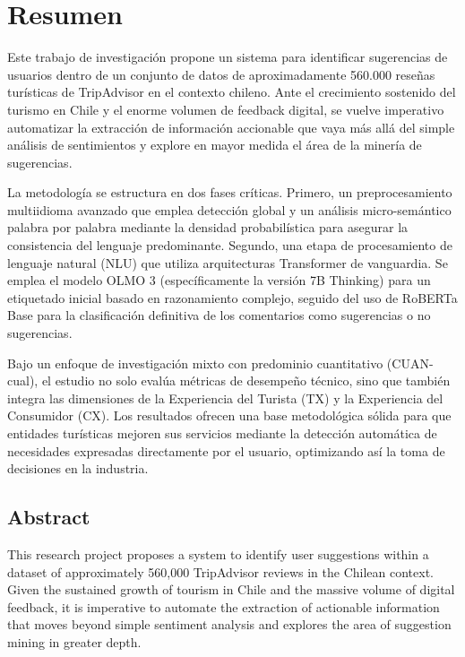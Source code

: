 \chapter{Resumen}
\label{cha:resumen}

Este trabajo de investigación propone un sistema para identificar sugerencias de usuarios dentro de un conjunto de datos de aproximadamente 560.000 reseñas turísticas de TripAdvisor en el contexto chileno. Ante el crecimiento sostenido del turismo en Chile y el enorme volumen de feedback digital, se vuelve imperativo automatizar la extracción de información accionable que vaya más allá del simple análisis de sentimientos y explore en mayor medida el área de la minería de sugerencias.

La metodología se estructura en dos fases críticas. Primero, un preprocesamiento multiidioma avanzado que emplea detección global y un análisis micro-semántico palabra por palabra mediante la densidad probabilística para asegurar la consistencia del lenguaje predominante. Segundo, una etapa de procesamiento de lenguaje natural (NLU) que utiliza arquitecturas Transformer de vanguardia. Se emplea el modelo OLMO 3 (específicamente la versión 7B Thinking) para un etiquetado inicial basado en razonamiento complejo, seguido del uso de RoBERTa Base para la clasificación definitiva de los comentarios como sugerencias o no sugerencias.

Bajo un enfoque de investigación mixto con predominio cuantitativo (CUAN-cual), el estudio no solo evalúa métricas de desempeño técnico, sino que también integra las dimensiones de la Experiencia del Turista (TX) y la Experiencia del Consumidor (CX). Los resultados ofrecen una base metodológica sólida para que entidades turísticas mejoren sus servicios mediante la detección automática de necesidades expresadas directamente por el usuario, optimizando así la toma de decisiones en la industria.

\section{Abstract}
\label{cha:abstract}

This research project proposes a system to identify user suggestions within a dataset of approximately 560,000 TripAdvisor reviews in the Chilean context. Given the sustained growth of tourism in Chile and the massive volume of digital feedback, it is imperative to automate the extraction of actionable information that moves beyond simple sentiment analysis and explores the area of suggestion mining in greater depth.

